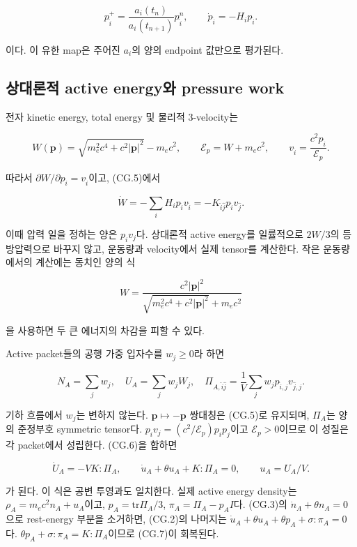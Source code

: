 \documentclass[11pt,a4paper]{article}
\begin{document}
\[
\boxed{
p_{\hat i}^{+}
=\frac{a_i(t_n)}{a_i(t_{n+1})}p_{\hat i}^{n},
\qquad
\dot p_{\hat i}=-H_i p_{\hat i}.
}
\tag{CG.5}
\]

이다. 이 유한 map은 주어진 \(a_i\)의 양의 endpoint 값만으로 평가된다.

\hypertarget{uxc0c1uxb300uxb860uxc801-active-energyuxc640-pressure-work}{%
\subsection{상대론적 active energy와 pressure work}\label{uxc0c1uxb300uxb860uxc801-active-energyuxc640-pressure-work}}

전자 kinetic energy, total energy 및 물리적 3-velocity는

\[
W(\boldsymbol p)
=\sqrt{m_e^2c^4+c^2|\boldsymbol p|^2}-m_ec^2,\qquad
\mathcal E_p=W+m_ec^2,\qquad
v_{\hat i}=\frac{c^2p_{\hat i}}{\mathcal E_p}.
\]

따라서 \(\partial W/\partial p_{\hat i}=v_{\hat i}\)이고, (CG.5)에서

\[
\boxed{
\dot W
=-\sum_iH_i p_{\hat i}v_{\hat i}
=-K_{\hat i\hat j}p_{\hat i}v_{\hat j}.
}
\tag{CG.6}
\]

이때 압력 일을 정하는 양은 \(p_iv_j\)다. 상대론적 active energy를 일률적으로 \(2W/3\)의 등방압력으로 바꾸지 않고, 운동량과 velocity에서 실제 tensor를 계산한다. 작은 운동량에서의 계산에는 동치인 양의 식

\[
W=\frac{c^2|\boldsymbol p|^2}
{\sqrt{m_e^2c^4+c^2|\boldsymbol p|^2}+m_ec^2}
\]

을 사용하면 두 큰 에너지의 차감을 피할 수 있다.

Active packet들의 공행 가중 입자수를 \(w_j\ge0\)라 하면

\[
N_A=\sum_jw_j,\quad
U_A=\sum_jw_j W_j,\quad
\Pi_{A,\hat i\hat j}
=\frac1V\sum_jw_jp_{\hat i,j}v_{\hat j,j}.
\]

기하 흐름에서 \(w_j\)는 변하지 않는다. \(\boldsymbol p\mapsto-\boldsymbol p\) 쌍대칭은 (CG.5)로 유지되며, \(\Pi_A\)는 양의 준정부호 symmetric tensor다. \(p_i v_j=(c^2/\mathcal E_p)p_i p_j\)이고 \(\mathcal E_p>0\)이므로 이 성질은 각 packet에서 성립한다. (CG.6)을 합하면

\[
\boxed{
\dot U_A=-V K:\Pi_A,\qquad
\dot u_A+\theta u_A+K:\Pi_A=0,\qquad u_A=U_A/V.
}
\tag{CG.7}
\]

가 된다. 이 식은 공변 투영과도 일치한다. 실제 active energy density는 \(\rho_A=m_ec^2n_A+u_A\)이고, \(p_A=\mathrm{tr}\Pi_A/3\), \(\pi_A=\Pi_A-p_AI\)다. (CG.3)의 \(\dot n_A+\theta n_A=0\)으로 rest-energy 부분을 소거하면, (CG.2)의 나머지는 \(\dot u_A+\theta u_A+\theta p_A+\sigma:\pi_A=0\)다. \(\theta p_A+\sigma:\pi_A=K:\Pi_A\)이므로 (CG.7)이 회복된다.
\end{document}
